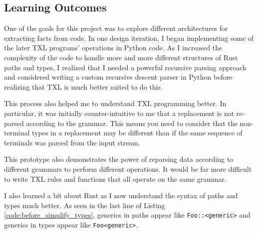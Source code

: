 \documentclass[11pt]{article}
\begin{document}
\subsection{Learning Outcomes}

One of the goals for this project was to explore different architectures for extracting facts from code.
In one design iteration, I began implementing some of the later TXL programs' operations in Python code.
As I increased the complexity of the code to handle more and more different structures of Rust paths and types, I realized that I needed a powerful recursive parsing approach and considered writing a custom recursive descent parser in Python before realizing that TXL is much better suited to do this.

This process also helped me to understand TXL programming better.
In particular, it was initially counter-intuitive to me that a replacement is not re-parsed according to the grammar.
This means you need to consider that the non-terminal types in a replacement may be different than if the same sequence of terminals was parsed from the input stream.

This prototype also demonstrates the power of reparsing data according to different grammars to perform different operations.
It would be far more difficult to write TXL rules and functions that all operate on the same grammar.


I also learned a bit about Rust as I now understand the syntax of paths and types much better.
As seen in the last line of Listing \ref{code:before_simplify_types}, generics in paths appear like \lstinline{Foo::<generic>} and generics in types appear like \lstinline{Foo<generic>}.


\end{document}
